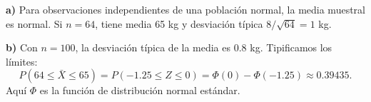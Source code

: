 \textbf{a)} Para observaciones independientes de una población
normal, la media muestral es normal. Si $n=64$, tiene media
65 kg y desviación típica $8/\sqrt{64}=1$ kg.

\textbf{b)} Con $n=100$, la desviación típica de la media es $0.8$ kg.
Tipificamos los límites:
\[
P(64\le\bar X\le65)
=P(-1.25\le Z\le0)
=\Phi(0)-\Phi(-1.25)\approx\boxed{0.39435}.
\]
Aquí $\Phi$ es la función de distribución normal estándar.
